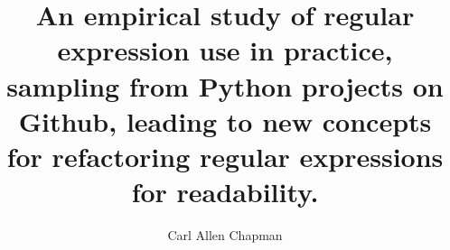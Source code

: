 \title{An empirical study of regular expression use in practice, sampling from Python projects on Github, leading to new concepts for refactoring regular expressions for readability.}
\author{Carl Allen Chapman}
\notice
\maketitle
